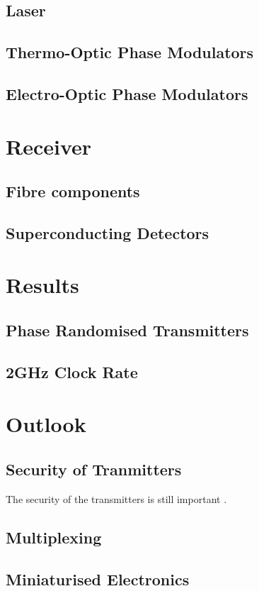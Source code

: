 \subsection{Laser}

\subsection{Thermo-Optic Phase Modulators}

\subsection{Electro-Optic Phase Modulators}

\section{Receiver}

\subsection{Fibre components}

\subsection{Superconducting Detectors}

\section{Results}

\subsection{Phase Randomised Transmitters}

\subsection{2GHz Clock Rate}

\section{Outlook}

\subsection{Security of Tranmitters}

The security of the transmitters is still important \cite{makarov2019}.

\subsection{Multiplexing}

\subsection{Miniaturised Electronics}


